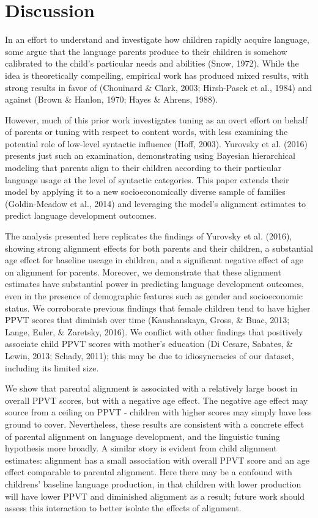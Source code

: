 \documentclass[10pt, letterpaper]{article}
\begin{document}
\hypertarget{discussion}{%
\section{Discussion}\label{discussion}}

In an effort to understand and investigate how children rapidly acquire
language, some argue that the language parents produce to their children
is somehow calibrated to the child's particular needs and abilities
(Snow, 1972). While the idea is theoretically compelling, empirical work
has produced mixed results, with strong results in favor of (Chouinard
\& Clark, 2003; Hirsh-Pasek et al., 1984) and against (Brown \& Hanlon,
1970; Hayes \& Ahrens, 1988).

However, much of this prior work investigates tuning as an overt effort
on behalf of parents or tuning with respect to content words, with less
examining the potential role of low-level syntactic influence (Hoff,
2003). Yurovsky et al. (2016) presents just such an examination,
demonstrating using Bayesian hierarchical modeling that parents align to
their children according to their particular language usage at the level
of syntactic categories. This paper extends their model by applying it
to a new socioeconomically diverse sample of families (Goldin-Meadow et
al., 2014) and leveraging the model's alignment estimates to predict
language development outcomes.

The analysis presented here replicates the findings of Yurovsky et al.
(2016), showing strong alignment effects for both parents and their
children, a substantial age effect for baseline useage in children, and
a significant negative effect of age on alignment for parents. Moreover,
we demonstrate that these alignment estimates have substantial power in
predicting language development outcomes, even in the presence of
demographic features such as gender and socioeconomic status. We
corroborate previous findings that female children tend to have higher
PPVT scores that diminish over time (Kaushanskaya, Gross, \& Buac, 2013;
Lange, Euler, \& Zaretsky, 2016). We conflict with other findings that
positively associate child PPVT scores with mother's education (Di
Cesare, Sabates, \& Lewin, 2013; Schady, 2011); this may be due to
idiosyncracies of our dataset, including its limited size.

We show that parental alignment is associated with a relatively large
boost in overall PPVT scores, but with a negative age effect. The
negative age effect may source from a ceiling on PPVT - children with
higher scores may simply have less ground to cover. Nevertheless, these
results are consistent with a concrete effect of parental alignment on
language development, and the linguistic tuning hypothesis more broadly.
A similar story is evident from child alignment estimates: alignment has
a small association with overall PPVT score and an age effect comparable
to parental alignment. Here there may be a confound with childrens'
baseline language production, in that children with lower production
will have lower PPVT and diminished alignment as a result; future work
should assess this interaction to better isolate the effects of
alignment.
\end{document}
